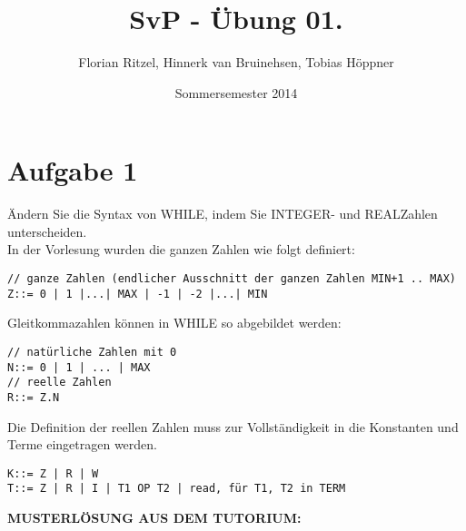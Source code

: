 \documentclass[ngerman,a4paper]{report}
\author{Florian Ritzel, Hinnerk van Bruinehsen, Tobias Höppner}
\title{SvP - Übung 01. }
\date{Sommersemester 2014}
\renewcommand{\maketitle}{}
\begin{document}
 
\maketitle 
\section*{Aufgabe 1}
Ändern Sie die Syntax von WHILE, indem Sie INTEGER- und REALZahlen unterscheiden.\\
In der Vorlesung wurden die ganzen Zahlen wie folgt definiert:
\begin{lstlisting}
// ganze Zahlen (endlicher Ausschnitt der ganzen Zahlen MIN+1 .. MAX)
Z::= 0 | 1 |...| MAX | -1 | -2 |...| MIN 
\end{lstlisting}
Gleitkommazahlen können in WHILE so abgebildet werden:
\begin{lstlisting}
// natürliche Zahlen mit 0
N::= 0 | 1 | ... | MAX
// reelle Zahlen
R::= Z.N
\end{lstlisting}
Die Definition der reellen Zahlen muss zur Vollständigkeit in die Konstanten und Terme eingetragen werden.
\begin{lstlisting}
K::= Z | R | W
T::= Z | R | I | T1 OP T2 | read, für T1, T2 in TERM
\end{lstlisting}
\textbf{MUSTERLÖSUNG AUS DEM TUTORIUM:}
\end{document}
